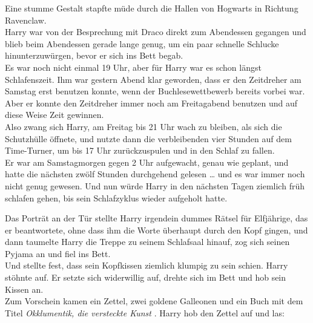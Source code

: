 {Eine stumme Gestalt stapfte müde durch die Hallen von Hogwarts in Richtung Ravenclaw.\\ Harry war von der Besprechung mit Draco direkt zum Abendessen gegangen und blieb beim Abendessen gerade lange genug, um ein paar schnelle Schlucke hinunterzuwürgen, bevor er sich ins Bett begab.\\ Es war noch nicht einmal 19 Uhr, aber für Harry war es schon längst Schlafenszeit. Ihm war gestern Abend klar geworden, dass er den Zeitdreher am Samstag erst benutzen konnte, wenn der Buchlesewettbewerb bereits vorbei war.\\ Aber er konnte den Zeitdreher immer noch am Freitagabend benutzen und auf diese Weise Zeit gewinnen.\\ Also zwang sich Harry, am Freitag bis 21 Uhr wach zu bleiben, als sich die Schutzhülle öffnete, und nutzte dann die verbleibenden vier Stunden auf dem Time-Turner, um bis 17 Uhr zurückzuspulen und in den Schlaf zu fallen.\\ Er war am Samstagmorgen gegen 2 Uhr aufgewacht, genau wie geplant, und hatte die nächsten zwölf Stunden durchgehend gelesen … und es war immer noch nicht genug gewesen. Und nun würde Harry in den nächsten Tagen ziemlich früh schlafen gehen, bis sein Schlafzyklus wieder aufgeholt hatte.

Das Porträt an der Tür stellte Harry irgendein dummes Rätsel für Elfjährige, das er beantwortete, ohne dass ihm die Worte überhaupt durch den Kopf gingen, und dann taumelte Harry die Treppe zu seinem Schlafsaal hinauf, zog sich seinen Pyjama an und fiel ins Bett.\\ Und stellte fest, dass sein Kopfkissen ziemlich klumpig zu sein schien. Harry stöhnte auf. Er setzte sich widerwillig auf, drehte sich im Bett und hob sein Kissen an.\\ Zum Vorschein kamen ein Zettel, zwei goldene Galleonen und ein Buch mit dem Titel \emph{Okklumentik, die versteckte Kunst} . Harry hob den Zettel auf und las:

}
